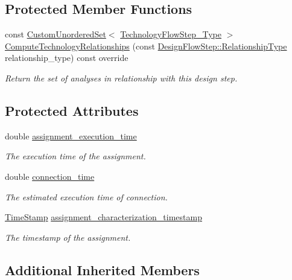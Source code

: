 \subsection*{Protected Member Functions}
\begin{DoxyCompactItemize}
\item 
const \hyperlink{classCustomUnorderedSet}{Custom\+Unordered\+Set}$<$ \hyperlink{technology__flow__step_8hpp_a65208cfec963a7d7def292f9db428292}{Technology\+Flow\+Step\+\_\+\+Type} $>$ \hyperlink{classFixCharacterization_a01b2fe97c0c10544d6dbc2671eedd35a}{Compute\+Technology\+Relationships} (const \hyperlink{classDesignFlowStep_a723a3baf19ff2ceb77bc13e099d0b1b7}{Design\+Flow\+Step\+::\+Relationship\+Type} relationship\+\_\+type) const override
\begin{DoxyCompactList}\small\item\em Return the set of analyses in relationship with this design step. \end{DoxyCompactList}\end{DoxyCompactItemize}
\subsection*{Protected Attributes}
\begin{DoxyCompactItemize}
\item 
double \hyperlink{classFixCharacterization_a72929764ff35242fc8b54f5bb18c81d7}{assignment\+\_\+execution\+\_\+time}
\begin{DoxyCompactList}\small\item\em The execution time of the assignment. \end{DoxyCompactList}\item 
double \hyperlink{classFixCharacterization_a94ef66e7a1a9d5a38f53b162534898a1}{connection\+\_\+time}
\begin{DoxyCompactList}\small\item\em The estimated execution time of connection. \end{DoxyCompactList}\item 
\hyperlink{structTimeStamp}{Time\+Stamp} \hyperlink{classFixCharacterization_aad760e86f9c577a6d1ce006cdeb07595}{assignment\+\_\+characterization\+\_\+timestamp}
\begin{DoxyCompactList}\small\item\em The timestamp of the assignment. \end{DoxyCompactList}\end{DoxyCompactItemize}
\subsection*{Additional Inherited Members}


